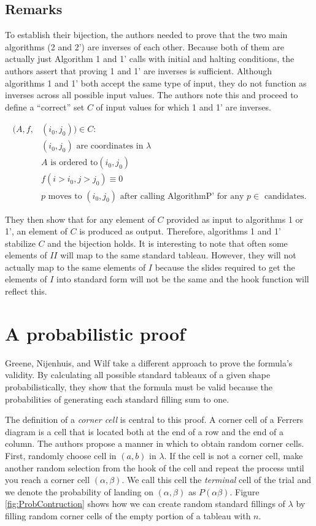 \documentclass[11pt]{article}
\theoremstyle{definition}
\begin{document}
\subsection{Remarks}
To establish their bijection, the authors needed to prove that the two main algorithms (2 and 2') are inverses of each other. Because both of them are actually just Algorithm 1 and 1' calls with initial and halting conditions, the authors assert that proving 1 and 1' are inverses is sufficient. Although algorithms 1 and 1' both accept the same type of input, they do not function as inverses across all possible input values. The authors note this and proceed to define a ``correct'' set $C$ of input values for which 1 and 1' are inverses.

\begin{equation*}
\begin{split}
    (A,f,&(i_0,j_0)) \in C: \\
      & (i_0,j_0) \text{ are coordinates in } \lambda \\
      & A \text{ is ordered to} (i_0,j_0) \\
      & f(i > i_0,j > j_0) \equiv 0 \\
      & p \text{ moves to } (i_0,j_0) \text{ after calling AlgorithmP' for any } p \in \text{ candidates.}
\end{split}
\end{equation*}

They then show that for any element of $C$ provided as input to algorithms 1 or 1', an element of $C$ is produced as output. Therefore, algorithms 1 and 1' stabilize $C$ and the bijection holds. It is interesting to note that often some elements of $II$ will map to the same standard tableau. However, they will not actually map to the same elements of $I$ because the slides required to get the elements of $I$ into standard form will not be the same and the hook function will reflect this.


\section{A probabilistic proof}
Greene, Nijenhuis, and Wilf\cite{Greene} take a different approach to prove the formula's validity. By calculating all possible standard tableaux of a given shape probabilistically, they show that the formula must be valid because the probabilities of generating each standard filling sum to one. 

The definition of a \emph{corner cell} is central to this proof. A corner cell of a Ferrers diagram is a cell that is located both at the end of a row and the end of a column. The authors propose a manner in which to obtain random corner cells. First, randomly choose cell in $(a,b)$ in $\lambda$. If the cell is not a corner cell, make another random selection from the hook of the cell and repeat the process until you reach a corner cell $(\alpha,\beta)$. We call this cell the \emph{terminal} cell of the trial and we denote the probability of landing on $(\alpha,\beta)$ as $P(\alpha\beta)$. 
Figure \ref{fig:ProbContruction} shows how we can create random standard fillings of $\lambda$ by filling random corner cells of the empty portion of a tableau with $n$.
\end{document}
